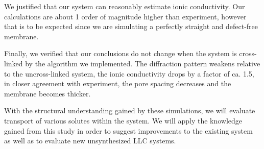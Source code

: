 \documentclass[journal=jpcbfk,manusciprt=article]{achemso}
\begin{document}
  We justified that our system can reasonably estimate ionic conductivity.  Our
  calculations are about 1 order of magnitude higher than experiment, however
  that is to be expected since we are simulating a perfectly straight and
  defect-free membrane. 

  Finally, we verified that our conclusions do not change when the system is
  cross-linked by the algorithm we implemented. The diffraction pattern weakens
  relative to the uncross-linked system, the ionic conductivity drops by a factor
  of ca. 1.5, in closer agreement with experiment, the pore spacing decreases and
  the membrane becomes thicker. 


  With the structural understanding gained by these simulations, we will
  evaluate transport of various solutes within the system. We will apply the
  knowledge gained from this study in order to suggest improvements to the
  existing system as well as to evaluate new unsynthesized LLC systems.

  \clearpage
  
\end{document}
